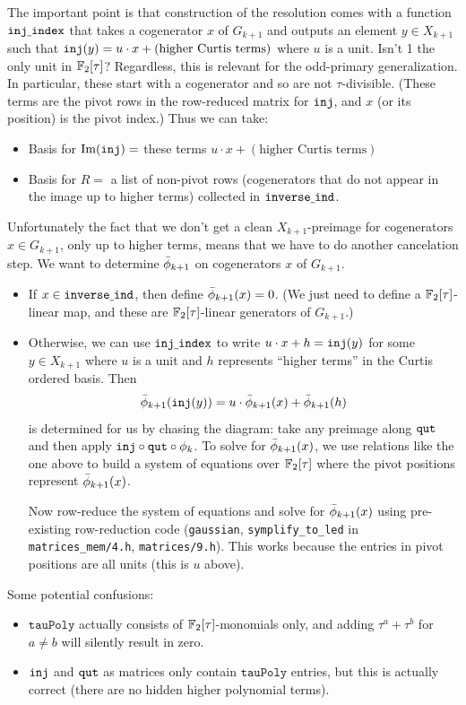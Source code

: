 \documentclass[11pt]{amsart}
\begin{document}
The important point is that construction of the
resolution comes with a function $\mathtt{inj}\underline{\ }\mathtt{index}$ that takes a cogenerator
$x$ of $G_{k+1}$ and outputs an element $y\in X_{k+1}$ such that $\mathtt{inj}(y)=u
\cdot x + (\text{higher Curtis terms})$ where $u$ is a unit. {\color{Gray}Isn't 1 the
only unit in $\mathbb{F}_2[\tau]$? Regardless, this is relevant for the odd-primary
generalization.}
In particular, these start with a cogenerator and so are not $\tau$-divisible.
(These terms are the pivot rows in the row-reduced
matrix for $\mathtt{inj}$, and $x$ (or its position) is the pivot index.) Thus we can take:
\begin{itemize} 
\item Basis for $\operatorname{Im}(\mathtt{inj}) = $ these terms $u\cdot x+(\text{higher Curtis terms})$ 
\item Basis for $R = $ a list of non-pivot rows (cogenerators that do not appear
in the image up to higher terms) collected in $\mathtt{inverse}\underline{\ }\mathtt{ind}$.
\end{itemize}

Unfortunately the fact that we don't get a clean $X_{k+1}$-preimage for cogenerators $x\in
G_{k+1}$, only up to higher terms, means that we have to do another cancelation
step. We want to determine $\bar{\phi}_{k+1}$ on cogenerators $x$ of $G_{k+1}$.
\begin{itemize} 
\item If $x\in \mathtt{inverse}\underline{\ }\mathtt{ind}$, then define $\bar{\phi}_{k+1}(x)=0$. (We just need to
define a $\mathbb{F}_2[\tau]$-linear map, and these are $\mathbb{F}_2[\tau]$-linear generators
of $G_{k+1}$.)
\item Otherwise, we can use $\mathtt{inj}\underline{\ }\mathtt{index}$ to write $u\cdot x + h = \mathtt{inj}(y)$ for some
$y\in X_{k+1}$ where $u$ is a unit and $h$ represents ``higher terms'' in the Curtis ordered
basis. Then 
$$\bar{\phi}_{k+1}(\mathtt{inj}(y)) = u\cdot \bar{\phi}_{k+1}(x) + \bar{\phi}_{k+1}(h)$$
is determined for us by chasing the diagram: take any preimage along $\mathtt{qut}$ and
then apply $\mathtt{inj}\circ \mathtt{qut}\circ \phi_k$. To solve for
$\bar{\phi}_{k+1}(x)$, we use relations like the one above to build a system of
equations over $\mathbb{F}_2[\tau]$ where the pivot positions represent
$\bar{\phi}_{k+1}(x)$.

Now row-reduce the system of equations and solve for $\bar{\phi}_{k+1}(x)$
using pre-existing row-reduction code (\verb=gaussian=, \verb=symplify_to_led= in
\verb=matrices_mem/4.h=, \verb=matrices/9.h=).
This works because the entries in pivot positions are all units (this is $u$
above).
\end{itemize}

Some potential confusions:
\begin{itemize} 
\item $\mathtt{tauPoly}$ actually consists of $\mathbb{F}_2[\tau]$-monomials only, and
adding $\tau^a + \tau^b$ for $a\neq b$ will silently result in zero.
\item $\mathtt{inj}$ and $\mathtt{qut}$ as matrices only contain $\mathtt{tauPoly}$ entries, but
this is actually correct (there are no hidden higher polynomial terms).
\end{itemize}



\end{document}
